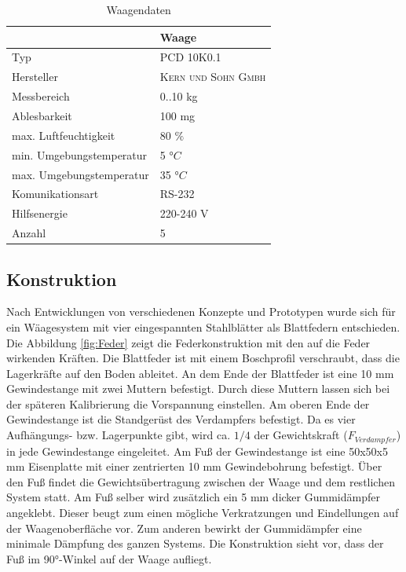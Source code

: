  
\begin{table}[htb]
\centering
\caption{Waagendaten}\vspace{6pt}
\begin{tabular}{ll}
\hline 
 & \textbf{Waage}  \\ 
\hline 
\hline 
Typ & PCD 10K0.1 \\ 
\hline 
Hersteller & \textsc{Kern und Sohn Gmbh} \\ 
\hline 
Messbereich & 0..10 kg \\ 
\hline 
Ablesbarkeit & 100 mg\\ 
\hline 
max. Luftfeuchtigkeit & 80 $\%$\\
\hline
min. Umgebungstemperatur & 5 $°C$\\
\hline
max. Umgebungstemperatur & 35 $°C$\\
\hline
Komunikationsart & RS-232 \\ 
\hline 
Hilfsenergie & 220-240  V   \\ 
\hline
Anzahl & 5 \\ 
\hline 
\hline 
\end{tabular} 
\label{tab:Waagendaten}
\end{table}



\subsection{Konstruktion}
\label{subsec:Waagen-Konstruktion}


Nach Entwicklungen von verschiedenen Konzepte und Prototypen wurde sich für ein Wäagesystem mit vier eingespannten Stahlblätter als Blattfedern entschieden.  Die Abbildung \ref{fig:Feder} zeigt die Federkonstruktion mit den auf die Feder wirkenden Kräften. Die Blattfeder ist mit einem Boschprofil verschraubt, dass die Lagerkräfte auf den Boden ableitet. An dem Ende der Blattfeder ist eine 10 mm Gewindestange mit zwei Muttern befestigt. Durch diese Muttern lassen sich bei der späteren Kalibrierung die Vorspannung einstellen. Am oberen Ende der Gewindestange ist die Standgerüst des Verdampfers befestigt. Da es vier Aufhängungs- bzw. Lagerpunkte gibt, wird ca. $1/4$ der Gewichtskraft ($F_{Verdampfer}$) in jede Gewindestange eingeleitet. Am Fuß der Gewindestange ist eine 50x50x5 mm Eisenplatte mit einer zentrierten 10 mm Gewindebohrung befestigt. Über den Fuß findet die Gewichtsübertragung zwischen der Waage und dem restlichen System statt. Am Fuß selber wird zusätzlich ein 5 mm dicker Gummidämpfer angeklebt. Dieser beugt zum einen mögliche Verkratzungen und Eindellungen auf der Waagenoberfläche vor. Zum anderen bewirkt der Gummidämpfer eine minimale Dämpfung des ganzen Systems. Die Konstruktion sieht vor, dass der Fuß im 90$°$-Winkel auf der Waage aufliegt. 

